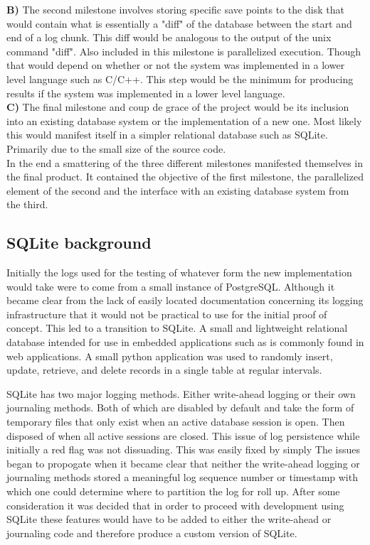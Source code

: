 \documentclass{article}
\begin{document}
\textbf{B)} The second milestone involves storing specific save points to the disk that would contain what 
is essentially a "diff" of the database between the start and end of a log chunk. This diff would be 
analogous to the output of the unix command "diff". Also included in this milestone is parallelized execution.
Though that would depend on whether or not the system was implemented in a lower level language such as C/C++. This step would be the minimum for producing results if the system was implemented in a lower level language.\\

\textbf{C)} The final milestone and coup de grace of the project would be its inclusion into an existing
database system or the implementation of a new one. Most likely this would manifest itself in a simpler
relational database such as SQLite. Primarily due to the small size of the source code.\\

In the end a smattering of the three different milestones manifested themselves in the final product. It contained the objective of the first milestone, the parallelized element of the second and the interface with an existing database system from the third.\\

\subsection{SQLite background}
Initially the logs used for the testing of whatever form the new implementation would take were to come from a small instance of PostgreSQL. Although it became clear from the lack of easily located documentation concerning its logging infrastructure that it would not be practical to use for the initial proof of concept. This led to a transition to SQLite. A small and lightweight relational database intended for use in embedded applications such as is commonly found in web applications. A small python application was used to randomly insert, update, retrieve, and delete records in a single table at regular intervals.
 
SQLite has two major logging methods. Either write-ahead logging or their own journaling methods. Both of which are disabled by default and take the form of temporary files that only exist when an active database session is open. Then disposed of when all active sessions are closed. This issue of log persistence while initially a red flag was not dissuading. This was easily fixed by simply The issues began to propogate when it became clear that neither the write-ahead logging or journaling methods stored a meaningful log sequence number or timestamp with which one could determine where to partition the log for roll up. After some consideration it was decided that in order to proceed with development using SQLite these features would have to be added to either the write-ahead or journaling code and therefore produce a custom version of SQLite.
\end{document}
